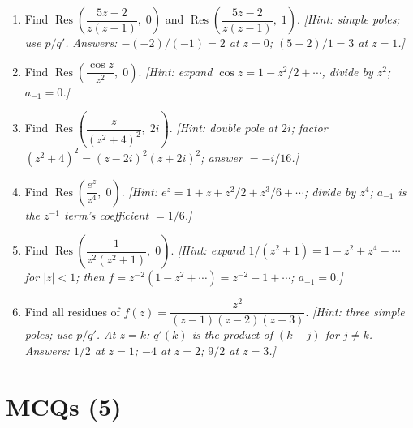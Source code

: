 \documentclass[12pt,a4paper]{article}
\begin{document}
\begin{enumerate}[leftmargin=*]
  \item Find $\operatorname{Res}\!\left(\dfrac{5z-2}{z(z-1)},\; 0\right)$ and
        $\operatorname{Res}\!\left(\dfrac{5z-2}{z(z-1)},\; 1\right)$.
        \textit{[Hint: simple poles; use $p/q'$.  Answers: $-(-2)/(-1) = 2$ at $z=0$;
        $(5-2)/1 = 3$ at $z=1$.]}

  \item Find $\operatorname{Res}\!\left(\dfrac{\cos z}{z^2},\; 0\right)$.
        \textit{[Hint: expand $\cos z = 1 - z^2/2 + \cdots$, divide by $z^2$; $a_{-1} = 0$.]}

  \item Find $\operatorname{Res}\!\left(\dfrac{z}{(z^2+4)^2},\; 2i\right)$.
        \textit{[Hint: double pole at $2i$; factor $(z^2+4)^2 = (z-2i)^2(z+2i)^2$; answer $= -i/16$.]}

  \item Find $\operatorname{Res}\!\left(\dfrac{e^z}{z^4},\; 0\right)$.
        \textit{[Hint: $e^z = 1 + z + z^2/2 + z^3/6 + \cdots$; divide by $z^4$;
        $a_{-1}$ is the $z^{-1}$ term's coefficient $= 1/6$.]}

  \item Find $\operatorname{Res}\!\left(\dfrac{1}{z^2(z^2+1)},\; 0\right)$.
        \textit{[Hint: expand $1/(z^2+1) = 1 - z^2 + z^4 - \cdots$ for $|z|<1$;
        then $f = z^{-2}(1 - z^2 + \cdots) = z^{-2} - 1 + \cdots$; $a_{-1} = 0$.]}

  \item Find all residues of $f(z) = \dfrac{z^2}{(z-1)(z-2)(z-3)}$.
        \textit{[Hint: three simple poles; use $p/q'$.  At $z=k$: $q'(k)$ is the product of
        $(k-j)$ for $j\neq k$.  Answers: $1/2$ at $z=1$; $-4$ at $z=2$; $9/2$ at $z=3$.]}
\end{enumerate}

\section{MCQs (5)}
\end{document}
